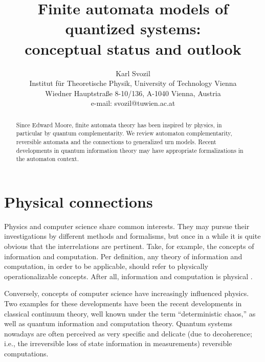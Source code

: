 \documentclass{llncs}
\begin{document}
\title{Finite automata models of quantized systems:\\conceptual status and outlook}
\author{Karl Svozil\\
 {\small Institut f\"ur Theoretische Physik, University of Technology Vienna }     \\
  {\small Wiedner Hauptstra\ss e 8-10/136,}
  {\small A-1040 Vienna, Austria   }            \\
  {\small e-mail: svozil@tuwien.ac.at}}

\maketitle
\begin{abstract}
Since Edward Moore, finite automata theory has been inspired
by physics, in particular by quantum complementarity. We review
automaton complementarity, reversible automata and the connections
to generalized urn models. Recent developments in quantum information theory
may have appropriate formalizations in the automaton context.
\end{abstract}




\section{Physical connections}

Physics and computer science share common interests.
They may pursue their investigations by different methods and formalisms,
but once in a while it is quite obvious that the interrelations are pertinent.
Take, for example, the concepts of information and computation.
Per definition, any theory of information and computation,
in order to be applicable, should refer to
physically operationalizable concepts.
After all, information and computation is physical \cite{landauer}.

Conversely, concepts of computer science have increasingly
influenced physics. Two examples for these developments have been
the recent developments in classical continuum theory, well known
under the term ``deterministic chaos,''
as well as quantum information and computation theory.
Quantum systems nowadays are often perceived as very specific and delicate
(due to decoherence; i.e., the irreversible loss of state information in measurements)
reversible computations.
\end{document}
